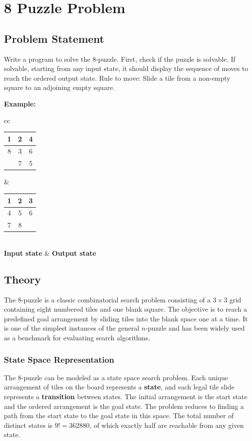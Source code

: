 \documentclass[12pt,a4paper]{report}
\begin{document}
\chapter{8 Puzzle Problem}

\section{Problem Statement}
Write a program to solve the 8-puzzle. First, check if the puzzle is solvable.
If solvable, starting from any input state, it should display the sequence of
moves to reach the ordered output state. Rule to move: Slide a tile from a
non-empty square to an adjoining empty square.

\medskip
\noindent\textbf{Example:}

\medskip
\noindent
\begin{tabular}{cc}
    \begin{tabular}{|c|c|c|}
        \hline
        1 & 2 & 4 \\
        \hline
        8 & 3 & 6 \\
        \hline
          & 7 & 5 \\
        \hline
    \end{tabular}
    &
    \begin{tabular}{|c|c|c|}
        \hline
        1 & 2 & 3 \\
        \hline
        4 & 5 & 6 \\
        \hline
        7 & 8 &   \\
        \hline
    \end{tabular}
    \\[6pt]
    \textbf{Input state} & \textbf{Output state}
\end{tabular}
\section{Theory}
The 8-puzzle is a classic combinatorial search problem consisting of a $3 \times 3$
grid containing eight numbered tiles and one blank square. The objective is to
reach a predefined goal arrangement by sliding tiles into the blank space one at
a time. It is one of the simplest instances of the general $n$-puzzle and has been
widely used as a benchmark for evaluating search algorithms.

\subsection{State Space Representation}
The 8-puzzle can be modeled as a state space search problem. Each unique
arrangement of tiles on the board represents a \textbf{state}, and each legal
tile slide represents a \textbf{transition} between states. The initial arrangement
is the start state and the ordered arrangement is the goal state. The problem
reduces to finding a path from the start state to the goal state in this space.
The total number of distinct states is $9! = 362880$, of which exactly half are
reachable from any given state.
\end{document}
